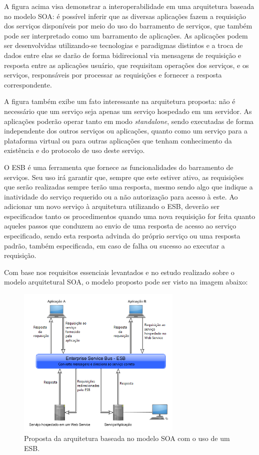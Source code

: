 A figura acima visa demonstrar a interoperabilidade em uma arquitetura baseada no modelo SOA: é possível inferir que as diversas aplicações fazem a requisição dos serviços disponíveis por meio do uso do barramento de serviços, que também pode ser interpretado como um barramento de aplicações. As aplicações podem ser desenvolvidas utilizando-se tecnologias e paradigmas distintos e a troca de dados entre elas se darão de forma bidirecional via mensagens de requisição e resposta entre as aplicações usuário, que requisitam operações dos serviços, e os serviços, responsáveis por processar as requisições e fornecer a resposta correspondente.

A figura também exibe um fato interessante na arquitetura proposta: não é necessário que um serviço seja apenas um serviço hospedado em um servidor. As aplicações poderão operar tanto em modo \textit{standalone}, sendo executadas de forma independente dos outros serviços ou aplicações, quanto como um serviço para a plataforma virtual ou para outras aplicações que tenham conhecimento da existência e do protocolo de uso deste serviço.

O ESB é uma ferramenta que fornece as funcionalidades do barramento de serviços. Seu uso irá garantir que, sempre que este estiver ativo, as requisições que serão realizadas sempre terão uma resposta, mesmo sendo algo que indique a inatividade do serviço requerido ou a não autorização para acesso à este. Ao adicionar um novo serviço à arquitetura utilizando o ESB, deverão ser especificados tanto os procedimentos quando uma nova requisição for feita quanto aqueles passos que conduzem ao envio de uma resposta de acesso ao serviço especificado, sendo esta resposta advinda do próprio serviço ou uma resposta padrão, também especificada, em caso de falha ou sucesso ao executar a requisição.

Com base nos requisitos essenciais levantados e no estudo realizado sobre o modelo arquitetural SOA, o modelo proposto pode ser visto na imagem abaixo:

\begin{figure}[htb]
\centering
\includegraphics[width=0.7\textwidth]{figuras/uso_esb.png}
\caption{Proposta da arquitetura baseada no modelo SOA com o uso de um ESB.}
\label{uso_esb}
\end{figure}

